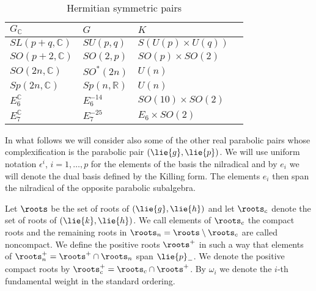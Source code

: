 \begin{table}\label{fig:herm_pairs}
\begin{center}%
\begin{tabular}{llll}
$G_\mathbb{C}$ & {\centering $G$ }&  $K$\\\hline
$SL(p+q,\mathbb{C})$ & $SU(p,q)$ &$S(U(p)\times U(q))$\\
$SO(p+2,\mathbb{C})$ &  $SO(2,p)$ & $SO(p)\times SO(2)$\\
$SO(2n,\mathbb{C})$ &   $SO^*(2n)$ & $U(n)$\\
$Sp(2n,\mathbb{C})$ &   $Sp(n,\mathbb{R})$ & $U(n)$\\
$E_6^\mathbb{C}$ &   $E_6^{-14}$& $SO(10)\times SO(2)$\\
$E_7^\mathbb{C}$ &  $E_7^{-25} $ & $E_6\times SO(2)$
\end{tabular}\caption{Hermitian symmetric pairs}
\end{center}
\end{table}

 In what follows we will consider also some of the other real parabolic pairs whose complexification is the parabolic pair $(\lie{g},\lie{p})$. We will use uniform notation $\epsilon^i$, $i=1,\ldots,p$ for the elements of the basis the nilradical and by $e_i$ we will denote the dual basis defined  by the Killing form. The elements $e_i$ then span the nilradical of the opposite parabolic subalgebra. %

Let $\roots$ be the set of roots of $(\lie{g},\lie{h})$ and let $\roots_c$ denote the set of roots of $(\lie{k},\lie{h})$. We call elements of $\roots_c$ the compact roots and the remaining roots in $\roots_n = \roots \setminus \roots_c$ are called noncompact. We define the positive roots $\roots^+$ in such a way that elements of $\roots_n^+ = \roots^+ \cap \roots_n$ span $\lie{p}_-$. We denote the positive compact roots by $\roots^+_c = \roots_c \cap \roots^+$. By $\omega_i$ we denote the $i$-th fundamental weight in the standard ordering.

